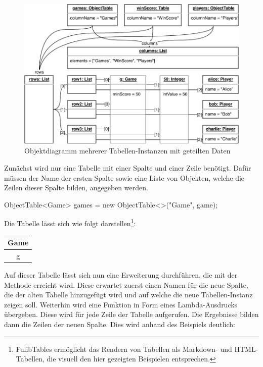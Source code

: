 \begin{figure}
    \includegraphics[width=\textwidth]{chapter/pattern-matching/img/tables-object-diagram.pdf}
    \caption{Objektdiagramm mehrerer Tabellen-Instanzen mit geteilten Daten}
    \label{fig:tables-object-diagram}
\end{figure}

Zunächst wird nur eine Tabelle mit einer Spalte und einer Zeile benötigt.
Dafür müssen der Name der ersten Spalte sowie eine Liste von Objekten, welche die Zeilen dieser Spalte bilden, angegeben werden.

\begin{jcodeblock}
    ObjectTable<Game> games = new ObjectTable<>("Game", game);
\end{jcodeblock}

Die Tabelle lässt sich wie folgt darstellen\footnote{FulibTables ermöglicht das Rendern von Tabellen als Markdown- und HTML-Tabellen, die visuell den hier gezeigten Beispielen entsprechen.}:

\begin{tabular}{|c|}
    \hline
    \textbf{Game} \\
    \hline
    g \\
    \hline
\end{tabular}

Auf dieser Tabelle lässt sich nun eine Erweiterung durchführen, die mit der Methode  erreicht wird.
Diese erwartet zuerst einen Namen für die neue Spalte, die der alten Tabelle hinzugefügt wird und auf welche die neue Tabellen-Instanz zeigen soll.
Weiterhin wird eine Funktion in Form eines Lambda-Ausdrucks übergeben.
Diese wird für jede Zeile der Tabelle aufgerufen.
Die Ergebnisse bilden dann die Zeilen der neuen Spalte.
Dies wird anhand des Beispiels deutlich:

